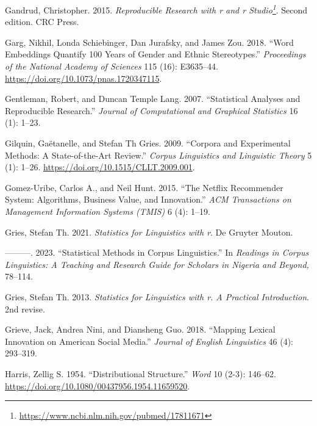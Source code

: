 \documentclass[
  letterpaper,
  DIV=11,
  numbers=noendperiod]{scrreport}
\newlength{\cslhangindent}
\newlength{\cslentryspacingunit} %
\newenvironment{CSLReferences}[2] %
 {%
  \setlength{\parindent}{0pt}
  \ifodd #1
  \let\oldpar\par
  \def\par{\hangindent=\cslhangindent\oldpar}
  \fi
  \setlength{\parskip}{#2\cslentryspacingunit}
 }%
 {}
\theoremstyle{definition}
\theoremstyle{remark}
\DeclareRobustCommand{\href}[2]{#2\footnote{\url{#1}}}
\begin{document}
\begin{CSLReferences}{1}{0}
\leavevmode{}%
Gandrud, Christopher. 2015.
\emph{\href{https://www.ncbi.nlm.nih.gov/pubmed/17811671}{Reproducible
Research with r and r Studio}}. Second edition. CRC Press.

\leavevmode{}%
Garg, Nikhil, Londa Schiebinger, Dan Jurafsky, and James Zou. 2018.
{``Word Embeddings Quantify 100 Years of Gender and Ethnic
Stereotypes.''} \emph{Proceedings of the National Academy of Sciences}
115 (16): E3635--44. \url{https://doi.org/10.1073/pnas.1720347115}.

\leavevmode{}%
Gentleman, Robert, and Duncan Temple Lang. 2007. {``Statistical Analyses
and Reproducible Research.''} \emph{Journal of Computational and
Graphical Statistics} 16 (1): 1--23.

\leavevmode{}%
Gilquin, Gaëtanelle, and Stefan Th Gries. 2009. {``Corpora and
Experimental Methods: A State-of-the-Art Review.''} \emph{Corpus
Linguistics and Linguistic Theory} 5 (1): 1--26.
\url{https://doi.org/10.1515/CLLT.2009.001}.

\leavevmode{}%
Gomez-Uribe, Carlos A., and Neil Hunt. 2015. {``The Netflix Recommender
System: Algorithms, Business Value, and Innovation.''} \emph{ACM
Transactions on Management Information Systems (TMIS)} 6 (4): 1--19.

\leavevmode{}%
Gries, Stefan Th. 2021. \emph{Statistics for Linguistics with r}. De
Gruyter Mouton.

\leavevmode{}%
---------. 2023. {``Statistical Methods in Corpus Linguistics.''} In
\emph{Readings in Corpus Linguistics: A Teaching and Research Guide for
Scholars in Nigeria and Beyond,} 78--114.

\leavevmode{}%
Gries, Stefan Th. 2013. \emph{Statistics for Linguistics with r. A
Practical Introduction}. 2nd revise.

\leavevmode{}%
Grieve, Jack, Andrea Nini, and Diansheng Guo. 2018. {``Mapping Lexical
Innovation on American Social Media.''} \emph{Journal of English
Linguistics} 46 (4): 293--319.

\leavevmode{}%
Harris, Zellig S. 1954. {``Distributional Structure.''} \emph{Word} 10
(2-3): 146--62. \url{https://doi.org/10.1080/00437956.1954.11659520}.


\end{CSLReferences}
\end{document}
